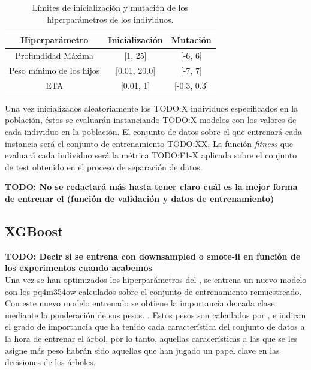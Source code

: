         \begin{table}[H]
            \centering
                \begin{tabular}{ |c|c|c| } 
                \hline
                \textbf{Hiperparámetro} & \textbf{Inicialización} & \textbf{Mutación}\\
                \hline
                    Profundidad Máxima & [1, 25] & [-6, 6]\\ 
                    Peso mínimo de los hijos & [0.01, 20.0] & [-7, 7] \\ 
                    ETA & [0.01, 1] &  [-0.3, 0.3] \\ 
                \hline

                \end{tabular}

            \caption{Límites de inicialización y mutación de los hiperparámetros de los individuos.}
            \label{InitAndMutationLimitsHyperparamsTable}
        \end{table}

        Una vez inicializados aleatoriamente los TODO:X individuos especificados en la población, éstos se evaluarán instanciando TODO:X modelos  con los valores de cada individuo en la población. El conjunto de datos sobre el que entrenará cada instancia  será el conjunto de entrenamiento TODO:XX. La función \textit{fitness} que evaluará cada individuo será la métrica TODO:F1-X aplicada sobre el conjunto de test obtenido en el proceso de separación de datos.

        \textbf{TODO: No se redactará más hasta tener claro cuál es la mejor forma de entrenar el  (función de validación y datos de entrenamiento)}






    \subsection{XGBoost}


        \textbf{TODO: Decir si se entrena con downsampled o smote-ii en función de los experimentos cuando acabemos}\\

        Una vez se han optimizados los hiperparámetros del , se entrena un nuevo modelo con los pq4m354ow calculados sobre el conjunto de entrenamiento remuestreado. Con este nuevo modelo  entrenado se obtiene la importancia de cada clase mediante la ponderación de sus pesos. \cite{XGBoostFeatureWeightsMeaning}. Estos pesos son calculados por , e indican el grado de importancia que ha tenido cada característica del conjunto de datos a la hora de entrenar el árbol, por lo tanto, aquellas caracerísticas a las que se les asigne más peso habrán sido aquellas que han jugado un papel clave en las decisiones de los árboles.

